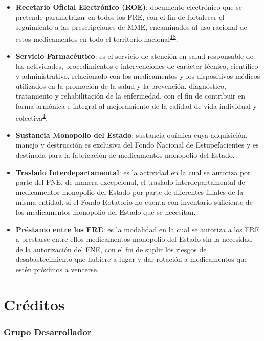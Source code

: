 \documentclass[
]{book}
\begin{document}
\begin{itemize}
\item
  \textbf{Recetario Oficial Electrónico (ROE)}: documento electrónico que se pretende parametrizar en todos los FRE, con el fin de fortalecer el seguimiento a las prescripciones de MME, encaminados al uso racional de estos medicamentos en todo el territorio nacional\textsuperscript{\protect\hyperlink{ref-CuervoBustamante2021}{18}}.
\item
  \textbf{Servicio Farmacéutico}: es el servicio de atención en salud responsable de las actividades, procedimientos e intervenciones de carácter técnico, científico y administrativo, relacionado con los medicamentos y los dispositivos médicos utilizados en la promoción de la salud y la prevención, diagnóstico, tratamiento y rehabilitación de la enfermedad, con el fin de contribuir en forma armónica e integral al mejoramiento de la calidad de vida individual y colectiva\textsuperscript{\protect\hyperlink{ref-MSPS1478-2006}{1}}.
\item
  \textbf{Sustancia Monopolio del Estado}: sustancia química cuya adquisición, manejo y destrucción es exclusiva del Fondo Nacional de Estupefacientes y es destinada para la fabricación de medicamentos monopolio del Estado.
\item
  \textbf{Traslado Interdepartamental}: es la actividad en la cual se autoriza por parte del FNE, de manera excepcional, el traslado interdepartamental de medicamentos monopolio del Estado por parte de diferentes filiales de la misma entidad, si el Fondo Rotatorio no cuenta con inventario suficiente de los medicamentos monopolio del Estado que se necesitan.
\item
  \textbf{Préstamo entre los FRE}: es la modalidad en la cual se autoriza a los FRE a prestarse entre ellos medicamentos monopolio del Estado sin la necesidad de la autorización del FNE, con el fin de suplir los riesgos de desabastecimiento que hubiere a lugar y dar rotación a medicamentos que estén próximos a vencerse.
\end{itemize}

\hypertarget{cruxe9ditos}{%
\chapter*{Créditos}\label{cruxe9ditos}}

\hypertarget{grupo-desarrollador}{%
\subsection*{Grupo Desarrollador}\label{grupo-desarrollador}}
\end{document}
